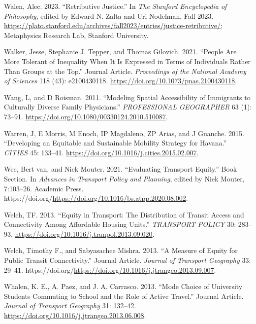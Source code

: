 \documentclass[12pt, oneside]{report}
\newlength{\cslhangindent}
\newlength{\cslentryspacingunit} %
\newenvironment{CSLReferences}[2] %
 {%
  \setlength{\parindent}{0pt}
  \ifodd #1
  \let\oldpar\par
  \def\par{\hangindent=\cslhangindent\oldpar}
  \fi
  \setlength{\parskip}{#2\cslentryspacingunit}
 }%
 {}
\begin{document}
\begin{CSLReferences}{1}{0}
\leavevmode{}%
Walen, Alec. 2023. {``{Retributive Justice}.''} In \emph{The {Stanford}
Encyclopedia of Philosophy}, edited by Edward N. Zalta and Uri Nodelman,
{F}all 2023.
\url{https://plato.stanford.edu/archives/fall2023/entries/justice-retributive/};
Metaphysics Research Lab, Stanford University.

\leavevmode{}%
Walker, Jesse, Stephanie J. Tepper, and Thomas Gilovich. 2021. {``People
Are More Tolerant of Inequality When It Is Expressed in Terms of
Individuals Rather Than Groups at the Top.''} Journal Article.
\emph{Proceedings of the National Academy of Sciences} 118 (43):
e2100430118. \url{https://doi.org/10.1073/pnas.2100430118}.

\leavevmode{}%
Wang, L, and D Roisman. 2011. {``Modeling {Spatial Accessibility} of
{Immigrants} to {Culturally Diverse Family Physicians}.''}
\emph{PROFESSIONAL GEOGRAPHER} 63 (1): 73--91.
\url{https://doi.org/10.1080/00330124.2010.510087}.

\leavevmode{}%
Warren, J, E Morris, M Enoch, IP Magdaleno, ZP Arias, and J Guanche.
2015. {``Developing an Equitable and Sustainable Mobility Strategy for
{Havana}.''} \emph{CITIES} 45: 133--41.
\url{https://doi.org/10.1016/j.cities.2015.02.007}.

\leavevmode{}%
Wee, Bert van, and Niek Mouter. 2021. {``Evaluating Transport Equity.''}
Book Section. In \emph{Advances in Transport Policy and Planning},
edited by Niek Mouter, 7:103--26. Academic Press.
https://doi.org/\url{https://doi.org/10.1016/bs.atpp.2020.08.002}.

\leavevmode{}%
Welch, TF. 2013. {``Equity in Transport: {The} Distribution of Transit
Access and Connectivity Among Affordable Housing Units.''}
\emph{TRANSPORT POLICY} 30: 283--93.
\url{https://doi.org/10.1016/j.tranpol.2013.09.020}.

\leavevmode{}%
Welch, Timothy F., and Sabyasachee Mishra. 2013. {``A Measure of Equity
for Public Transit Connectivity.''} Journal Article. \emph{Journal of
Transport Geography} 33: 29--41.
https://doi.org/\url{https://doi.org/10.1016/j.jtrangeo.2013.09.007}.

\leavevmode{}%
Whalen, K. E., A. Paez, and J. A. Carrasco. 2013. {``Mode Choice of
University Students Commuting to School and the Role of Active
Travel.''} Journal Article. \emph{Journal of Transport Geography} 31:
132--42. \url{https://doi.org/10.1016/j.jtrangeo.2013.06.008}.


\end{CSLReferences}
\end{document}
